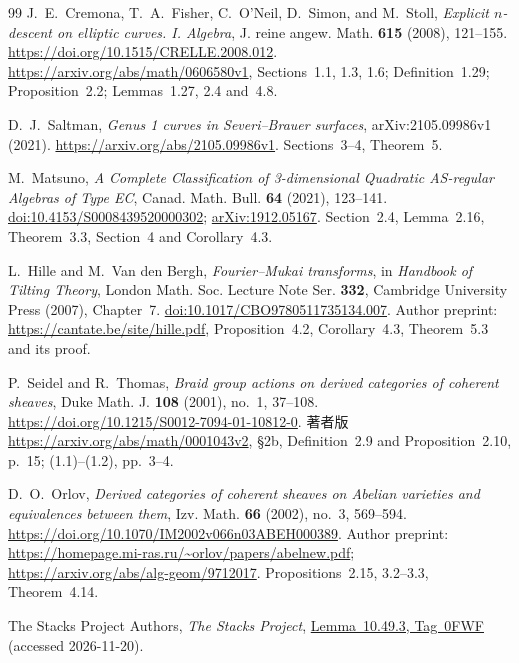 \begin{thebibliography}{99}
J.~E.~Cremona, T.~A.~Fisher, C.~O'Neil, D.~Simon, and M.~Stoll,
\emph{Explicit $n$-descent on elliptic curves. I. Algebra},
J. reine angew. Math. \textbf{615} (2008), 121--155.
\url{https://doi.org/10.1515/CRELLE.2008.012}.
\url{https://arxiv.org/abs/math/0606580v1},
Sections~1.1, 1.3, 1.6; Definition~1.29;
Proposition~2.2; Lemmas~1.27, 2.4 and~4.8.

D.~J.~Saltman,
\emph{Genus 1 curves in Severi--Brauer surfaces},
arXiv:2105.09986v1 (2021).
\url{https://arxiv.org/abs/2105.09986v1}.
Sections~3--4, Theorem~5.

M.~Matsuno,
\emph{A Complete Classification of 3-dimensional Quadratic AS-regular Algebras of Type EC},
Canad. Math. Bull. \textbf{64} (2021), 123--141.
\href{https://doi.org/10.4153/S0008439520000302}{doi:10.4153/S0008439520000302};
\href{https://arxiv.org/abs/1912.05167}{arXiv:1912.05167}.
Section~2.4, Lemma~2.16, Theorem~3.3, Section~4 and Corollary~4.3.

L.~Hille and M.~Van den Bergh,
\emph{Fourier--Mukai transforms},
in \emph{Handbook of Tilting Theory},
London Math. Soc. Lecture Note Ser. \textbf{332},
Cambridge University Press (2007), Chapter~7.
\href{https://doi.org/10.1017/CBO9780511735134.007}{doi:10.1017/CBO9780511735134.007}.
Author preprint: \url{https://cantate.be/site/hille.pdf},
Proposition~4.2, Corollary~4.3, Theorem~5.3 and its proof.

P.~Seidel and R.~Thomas,
\emph{Braid group actions on derived categories of coherent sheaves},
Duke Math. J. \textbf{108} (2001), no.~1, 37--108.
\url{https://doi.org/10.1215/S0012-7094-01-10812-0}.
著者版 \url{https://arxiv.org/abs/math/0001043v2},
\S2b, Definition~2.9 and Proposition~2.10, p.~15; (1.1)--(1.2), pp.~3--4.

D.~O.~Orlov,
\emph{Derived categories of coherent sheaves on Abelian varieties and equivalences between them},
Izv. Math. \textbf{66} (2002), no.~3, 569--594.
\url{https://doi.org/10.1070/IM2002v066n03ABEH000389}.
Author preprint: \url{https://homepage.mi-ras.ru/~orlov/papers/abelnew.pdf};
\url{https://arxiv.org/abs/alg-geom/9712017}.
Propositions~2.15, 3.2--3.3, Theorem~4.14.

The Stacks Project Authors,
\emph{The Stacks Project},
\href{https://stacks.math.columbia.edu/tag/0FWF}{Lemma~10.49.3, Tag~0FWF}
(accessed 2026-11-20).



\end{thebibliography}
